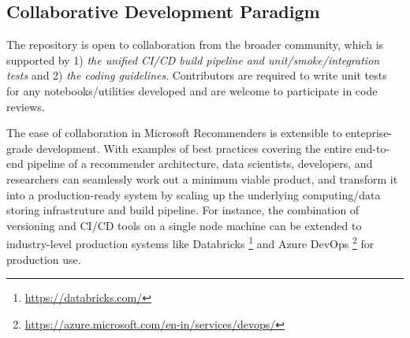 \subsection{Collaborative Development Paradigm} %

The repository is open to collaboration from the broader community, which is supported by 
1) \textit{the unified CI/CD build pipeline and unit/smoke/integration tests} and  
2) \textit{the coding guidelines}. Contributors are required to write unit tests for any notebooks/utilities developed and 
are welcome to participate in code reviews.


The ease of collaboration in Microsoft Recommenders is extensible to enteprise-grade development. With examples of best practices covering the entire end-to-end pipeline of a recommender architecture, data scientists, developers, and researchers can seamlessly work out a minimum viable product, and transform it into a production-ready system by scaling up the underlying computing/data storing infrastruture and build pipeline. For instance, the combination of versioning and CI/CD tools on a single node machine can be extended to industry-level production systems like Databricks \footnote{\url{https://databricks.com/}} and Azure DevOps \footnote{\url{https://azure.microsoft.com/en-in/services/devops/}} for production use.